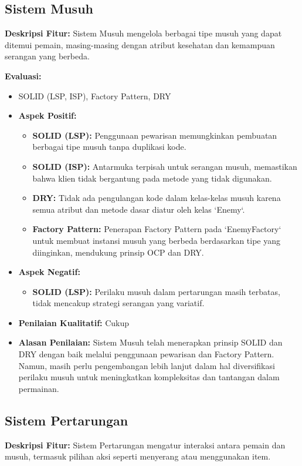 \documentclass[12pt]{article}
\begin{document}
\subsection{Sistem Musuh}
\textbf{Deskripsi Fitur:} Sistem Musuh mengelola berbagai tipe musuh yang dapat ditemui pemain, masing-masing dengan atribut kesehatan dan kemampuan serangan yang berbeda.

\textbf{Evaluasi:}
\begin{itemize}
    \item {} SOLID (LSP, ISP), Factory Pattern, DRY
    \item \textbf{Aspek Positif:}
    \begin{itemize}
        \item \textbf{SOLID (LSP):} Penggunaan pewarisan memungkinkan pembuatan berbagai tipe musuh tanpa duplikasi kode.
        \item \textbf{SOLID (ISP):} Antarmuka terpisah untuk serangan musuh, memastikan bahwa klien tidak bergantung pada metode yang tidak digunakan.
        \item \textbf{DRY:} Tidak ada pengulangan kode dalam kelas-kelas musuh karena semua atribut dan metode dasar diatur oleh kelas `Enemy`.
        \item \textbf{Factory Pattern:} Penerapan Factory Pattern pada `EnemyFactory` untuk membuat instansi musuh yang berbeda berdasarkan tipe yang diinginkan, mendukung prinsip OCP dan DRY.
    \end{itemize}
    \item \textbf{Aspek Negatif:}
    \begin{itemize}
        \item \textbf{SOLID (LSP):} Perilaku musuh dalam pertarungan masih terbatas, tidak mencakup strategi serangan yang variatif.
    \end{itemize}
    \item \textbf{Penilaian Kualitatif:} Cukup
    \item \textbf{Alasan Penilaian:} Sistem Musuh telah menerapkan prinsip SOLID dan DRY dengan baik melalui penggunaan pewarisan dan Factory Pattern. Namun, masih perlu pengembangan lebih lanjut dalam hal diversifikasi perilaku musuh untuk meningkatkan kompleksitas dan tantangan dalam permainan.
\end{itemize}

\subsection{Sistem Pertarungan}
\textbf{Deskripsi Fitur:} Sistem Pertarungan mengatur interaksi antara pemain dan musuh, termasuk pilihan aksi seperti menyerang atau menggunakan item.
\end{document}

